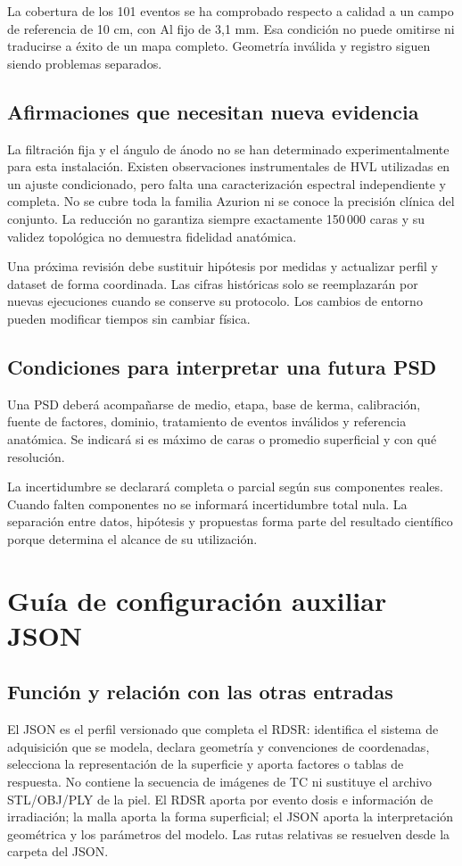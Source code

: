 La cobertura de los 101 eventos se ha comprobado respecto a calidad a un campo de referencia de 10 cm, con Al fijo de 3,1 mm. Esa condición no puede omitirse ni traducirse a éxito de un mapa completo. Geometría inválida y registro siguen siendo problemas separados.

\section{Afirmaciones que necesitan nueva evidencia}
La filtración fija y el ángulo de ánodo no se han determinado experimentalmente para esta instalación. Existen observaciones instrumentales de HVL utilizadas en un ajuste condicionado, pero falta una caracterización espectral independiente y completa. No se cubre toda la familia Azurion ni se conoce la precisión clínica del conjunto. La reducción no garantiza siempre exactamente 150\,000 caras y su validez topológica no demuestra fidelidad anatómica.

Una próxima revisión debe sustituir hipótesis por medidas y actualizar perfil y dataset de forma coordinada. Las cifras históricas solo se reemplazarán por nuevas ejecuciones cuando se conserve su protocolo. Los cambios de entorno pueden modificar tiempos sin cambiar física.

\section{Condiciones para interpretar una futura PSD}
Una PSD deberá acompañarse de medio, etapa, base de kerma, calibración, fuente de factores, dominio, tratamiento de eventos inválidos y referencia anatómica. Se indicará si es máximo de caras o promedio superficial y con qué resolución.

La incertidumbre se declarará completa o parcial según sus componentes reales. Cuando falten componentes no se informará incertidumbre total nula. La separación entre datos, hipótesis y propuestas forma parte del resultado científico porque determina el alcance de su utilización.

\chapter{Guía de configuración auxiliar JSON}
\label{ap:json}
\section{Función y relación con las otras entradas}
El JSON es el perfil versionado que completa el RDSR: identifica el sistema de adquisición que se modela, declara geometría y convenciones de coordenadas, selecciona la representación de la superficie y aporta factores o tablas de respuesta. No contiene la secuencia de imágenes de TC ni sustituye el archivo STL/OBJ/PLY de la piel. El RDSR aporta por evento dosis e información de irradiación; la malla aporta la forma superficial; el JSON aporta la interpretación geométrica y los parámetros del modelo. Las rutas relativas se resuelven desde la carpeta del JSON.

